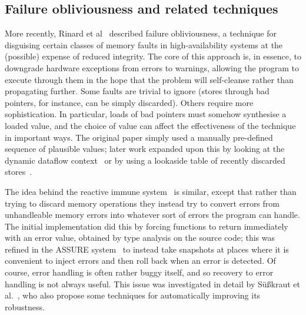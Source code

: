 \subsection{Failure obliviousness and related techniques}
More recently, Rinard et al~\cite{Rinard2004} described failure
obliviousness, a technique for disguising certain classes of memory
faults in high-availability systems at the (possible) expense of
reduced integrity.  The core of this approach is, in essence, to
downgrade hardware exceptions from errors to warnings, allowing the
program to execute through them in the hope that the problem will
self-cleanse rather than propagating further.  Some faults are trivial
to ignore (stores through bad pointers, for instance, can be simply
discarded).  Others require more sophistication.  In particular, loads
of bad pointers must somehow synthesise a loaded value, and the choice
of value can affect the effectiveness of the technique in important
ways.  The original paper simply used a manually pre-defined sequence
of plausible values; later work expanded upon this by looking at the
dynamic dataflow context~\cite{Nagarajan2009} or by using a lookaside
table of recently discarded stores~\cite{Rinard2005a}.

The idea behind the reactive immune system~\cite{Sidiroglou2005} is
similar, except that rather than trying to discard memory operations
they instead try to convert errors from unhandleable memory errors
into whatever sort of errors the program can handle.  The initial
implementation did this by forcing functions to return immediately
with an error value, obtained by type analysis on the source code;
this was refined in the ASSURE system~\cite{Sidiroglou2009} to instead
take snapshots at places where it is convenient to inject errors and
then roll back when an error is detected.  Of course, error handling
is often rather buggy itself, and so recovery to error handling is not
always useful.  This issue was investigated in detail by
S\"{u}\ss{}kraut et al.~\cite{Susskraut2006}, who also propose some
techniques for automatically improving its robustness.

